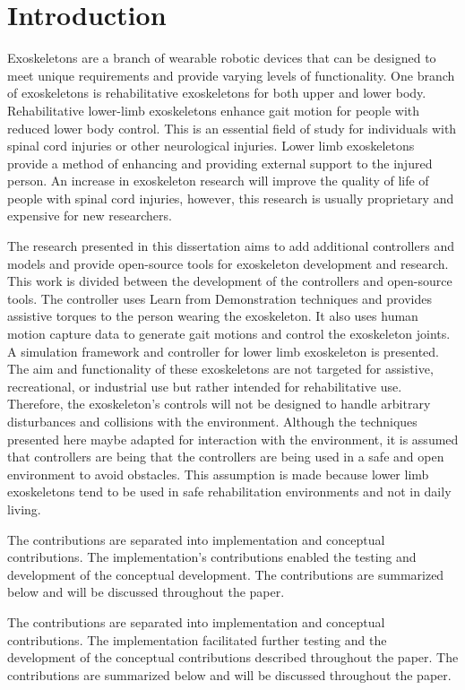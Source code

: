 \chapter{Introduction}

Exoskeletons are a branch of wearable robotic devices that can be designed to meet unique requirements and provide varying levels of functionality. One branch of exoskeletons is rehabilitative exoskeletons for both upper and lower body.  Rehabilitative lower-limb exoskeletons enhance gait motion for people with reduced lower body control. This is an essential field of study for individuals with spinal cord injuries or other neurological injuries. Lower limb exoskeletons provide a method of enhancing and providing external support to the injured person. An increase in exoskeleton research will improve the quality of life of people with spinal cord injuries, however, this research is usually proprietary and expensive for new researchers.




The research presented in this dissertation aims to add additional controllers and models and provide open-source tools for exoskeleton development and research. This work is divided between the development of the controllers and open-source tools. The controller uses Learn from Demonstration techniques and provides assistive torques to the person wearing the exoskeleton. It also uses human motion capture data to generate gait motions and control the exoskeleton joints. A simulation framework and controller for lower limb exoskeleton is presented. The aim and functionality of these exoskeletons are not targeted for assistive, recreational, or industrial use but rather intended for rehabilitative use. Therefore, the exoskeleton's controls will not be designed to handle arbitrary disturbances and collisions with the environment.  Although the techniques presented here maybe adapted for interaction with the environment, it is assumed that controllers are being that the controllers are being used in a safe and open environment to avoid obstacles. This assumption is made because lower limb exoskeletons tend to be used in safe rehabilitation environments and not in daily living.

The contributions are separated into implementation and conceptual contributions. The implementation's contributions enabled the testing and development of the conceptual development. The contributions are summarized below and will be discussed throughout the paper. 

The contributions are separated into implementation and conceptual contributions. The implementation facilitated further testing and the development of the conceptual contributions described throughout the paper. The contributions are summarized below and will be discussed throughout the paper. 

